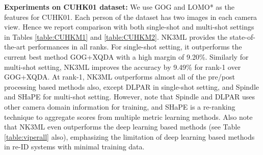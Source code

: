 \documentclass[runningheads]{llncs}
\begin{document}
\begin{table}[t]
\begin{center}
{}
\end{center}
\label{table:CUHK}
\end{table}

\setlength{\parskip}{1mm}
\noindent\textbf{Experiments on CUHK01 dataset:}
We use GOG and LOMO* as the features for CUHK01. Each person of the dataset has two images in each camera view. Hence we report comparison with both single-shot and multi-shot settings in Tables \ref{table:CUHKM1} and \ref{table:CUHKM2}. NK3ML provides the state-of-the-art performances in all ranks. For single-shot setting, it outperforms the current best method GOG+XQDA\cite{GOG} with a high margin of 9.20\%. Similarly for multi-shot setting, NK3ML improves the accuracy by  9.49\% for rank-1 over GOG+XQDA. At rank-1, NK3ML outperforms almost all of the pre/post processing based methods also, except DLPAR\cite{DLPAR} in single-shot setting, and Spindle\cite{SpindleNet} and SHaPE\cite{SHaPE} for multi-shot setting. However, note that Spindle and DLPAR uses other camera domain information for training, and SHaPE is a re-ranking technique to aggregate scores from multiple metric learning methods. Also note that NK3ML even outperforms the deep learning based methods
 (see Table \ref{table:viperall} also), 
emphasizing the limitation of deep learning based methods in re-ID systems with minimal training data. 
\setlength{\parskip}{0mm}
\end{document}
